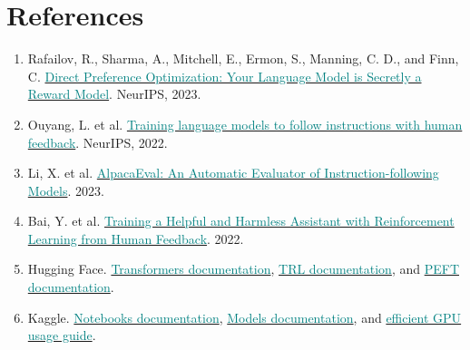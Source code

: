 \documentclass[11pt]{article}
\newcommand{\resource}[2]{\href{#2}{\textcolor{Teal}{#1}}}
\begin{document}
\section*{References}
\begin{enumerate}[leftmargin=*]
  \item Rafailov, R., Sharma, A., Mitchell, E., Ermon, S., Manning, C. D., and Finn, C. \resource{Direct Preference Optimization: Your Language Model is Secretly a Reward Model}{https://arxiv.org/abs/2305.18290}. NeurIPS, 2023.
  \item Ouyang, L. et al. \resource{Training language models to follow instructions with human feedback}{https://arxiv.org/abs/2203.02155}. NeurIPS, 2022.
  \item Li, X. et al. \resource{AlpacaEval: An Automatic Evaluator of Instruction-following Models}{https://arxiv.org/abs/2305.14387}. 2023.
  \item Bai, Y. et al. \resource{Training a Helpful and Harmless Assistant with Reinforcement Learning from Human Feedback}{https://arxiv.org/abs/2204.05862}. 2022.
  \item Hugging Face. \resource{Transformers documentation}{https://huggingface.co/docs/transformers/index}, \resource{TRL documentation}{https://huggingface.co/docs/trl/index}, and \resource{PEFT documentation}{https://huggingface.co/docs/peft/index}.
  \item Kaggle. \resource{Notebooks documentation}{https://www.kaggle.com/docs/notebooks}, \resource{Models documentation}{https://www.kaggle.com/docs/models}, and \resource{efficient GPU usage guide}{https://www.kaggle.com/docs/efficient-gpu-usage}.
\end{enumerate}
\end{document}
